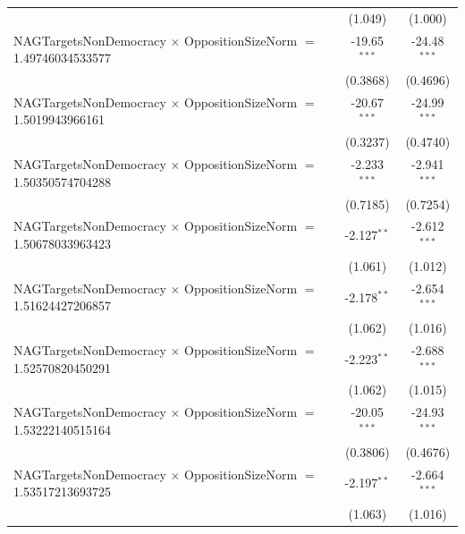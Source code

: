 \begin{tabular}{lcc}
                                                                                & (1.049)              & (1.000)\\   
   NAGTargetsNonDemocracy $\times$ OppositionSizeNorm $=$ 1.49746034533577      & -19.65$^{***}$       & -24.48$^{***}$\\   
                                                                                & (0.3868)             & (0.4696)\\   
   NAGTargetsNonDemocracy $\times$ OppositionSizeNorm $=$ 1.5019943966161       & -20.67$^{***}$       & -24.99$^{***}$\\   
                                                                                & (0.3237)             & (0.4740)\\   
   NAGTargetsNonDemocracy $\times$ OppositionSizeNorm $=$ 1.50350574704288      & -2.233$^{***}$       & -2.941$^{***}$\\   
                                                                                & (0.7185)             & (0.7254)\\   
   NAGTargetsNonDemocracy $\times$ OppositionSizeNorm $=$ 1.50678033963423      & -2.127$^{**}$        & -2.612$^{***}$\\   
                                                                                & (1.061)              & (1.012)\\   
   NAGTargetsNonDemocracy $\times$ OppositionSizeNorm $=$ 1.51624427206857      & -2.178$^{**}$        & -2.654$^{***}$\\   
                                                                                & (1.062)              & (1.016)\\   
   NAGTargetsNonDemocracy $\times$ OppositionSizeNorm $=$ 1.52570820450291      & -2.223$^{**}$        & -2.688$^{***}$\\   
                                                                                & (1.062)              & (1.015)\\   
   NAGTargetsNonDemocracy $\times$ OppositionSizeNorm $=$ 1.53222140515164      & -20.05$^{***}$       & -24.93$^{***}$\\   
                                                                                & (0.3806)             & (0.4676)\\   
   NAGTargetsNonDemocracy $\times$ OppositionSizeNorm $=$ 1.53517213693725      & -2.197$^{**}$        & -2.664$^{***}$\\   
                                                                                & (1.063)              & (1.016)\\   

\end{tabular}
